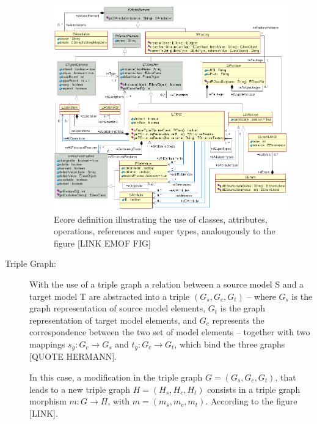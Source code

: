 \documentclass[tuberlin,cic,tc,openright,english,noabntcite]{iiufrgs}
\begin{document}
\begin{description}
\begin{figure}[h]
    \caption{Ecore definition illustrating the use of classes, attributes, operations, references and super types, analougously to the figure [LINK EMOF FIG]}
    \begin{center}
        \includegraphics[width=35em]{ecore_relations}   
    \end{center}
    \label{fig:ecore_relations}
\end{figure}

\item[Triple Graph:] With the use of a triple graph a relation between a source model S and a target model T are abstracted into a triple $(G_s,G_c,G_t)$ – where $G_s$ is the graph representation of source model elements, $G_t$ is the graph representation of target model elements, and $G_c$ represents the correspondence between the two set of model elements – together with two mappings $s_g: G_c \rightarrow G_s$ and $t_g: G_c \rightarrow G_t$, which bind the three graphs [QUOTE HERMANN].

In this case, a modification in the triple graph $G = (G_s,G_c,G_t)$, that leads to a new triple graph $H = (H_s,H_c,H_t)$ consists in a triple graph morphism $m: G \rightarrow H$, with $m = (m_s,m_c,m_t)$. According to the figure [LINK].


\end{description}
\end{document}
